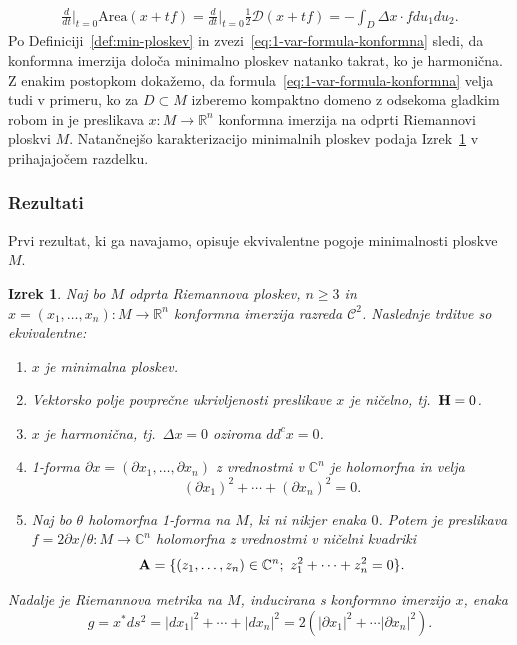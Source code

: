 \documentclass[12pt,a4paper,twoside]{article}
\theoremstyle{definition} %
\theoremstyle{plain} %
\newtheorem{izrek}[definicija]{Izrek}
\numberwithin{equation}{section}  %
\newcommand{\R}{\mathbb R}
\newcommand{\C}{\mathbb C}
\begin{document}
\begin{gather} \label{eq:1-var-formula-konformna}
\frac{d}{dt} \Big|_{t=0} \text{Area}(x+tf) = \frac{d}{dt} \Big|_{t=0} \frac{1}{2} \mathcal{D}(x+tf) = - \int_{D} \Delta{x} \cdot f du_1 du_2.
\end{gather}
Po Definiciji~\ref{def:min-ploskev} in zvezi~\eqref{eq:1-var-formula-konformna} sledi, da konformna imerzija določa minimalno ploskev natanko takrat, ko je harmonična. 
Z enakim postopkom dokažemo, da formula~\eqref{eq:1-var-formula-konformna} velja tudi v primeru, ko za $D \subset M$ izberemo kompaktno domeno z odsekoma gladkim robom in je preslikava $x \colon M \to \R^{n}$ konformna imerzija na odprti Riemannovi ploskvi $M$.
Natančnejšo karakterizacijo minimalnih ploskev podaja Izrek~\ref{izr:ekviv-min-ploskev} v prihajajočem razdelku.

\subsubsection{Rezultati}
%
Prvi rezultat, ki ga navajamo, opisuje ekvivalentne pogoje minimalnosti ploskve $M$.

\begin{izrek} \label{izr:ekviv-min-ploskev}
Naj bo $M$ odprta Riemannova ploskev, $n \geq 3$ in $x = (x_1, \dots , x_n) \colon M \to \R^{n}$ konformna imerzija razreda $\mathcal{C}^2$. Naslednje trditve so ekvivalentne:
\begin{enumerate}
	\item $x$ je minimalna ploskev.
	\item Vektorsko polje povprečne ukrivljenosti preslikave $x$ je ničelno, tj.~$\textbf{\textup{H}} = 0$.
	\item $x$ je harmonična, tj.~$\Delta{x} = 0$ oziroma $dd^{c}x = 0$.
	\item 1-forma $ \partial{x} = (\partial{x_1}, \dots , \partial{x_n})$ z vrednostmi v $\C^{n}$ je holomorfna in velja
			\begin{equation} \label{eq:partialx^2 = 0}
			(\partial{x_1})^2 + \cdots + (\partial{x_n})^2 = 0.
			\end{equation}
	\item Naj bo $\theta$ holomorfna 1-forma na $M$, ki ni nikjer enaka $0$. Potem je preslikava $f = 2\partial{x} / \theta \colon M \to \C^{n}$ holomorfna z 				vrednostmi v ničelni kvadriki
			\begin{equation}	
			\textbf{\textup{A}} = \{ (z_1, \dots , z_n) \in \C^{n} ; \ z_{1}^{2} + \cdots + z_{n}^{2} = 0 \}.
			\end{equation}	
\end{enumerate}
Nadalje je Riemannova metrika na $M$, inducirana s konformno imerzijo $x$, enaka
	\begin{equation} \label{eq:|dx|^2=2|partialx|^2}
	g = x^{*} ds^2 = |dx_1|^2 + \cdots + |dx_n|^2 = 2 (|\partial{x_1}|^2 + \cdots |\partial{x_n}|^2).
	\end{equation}			
\end{izrek}
\end{document}
